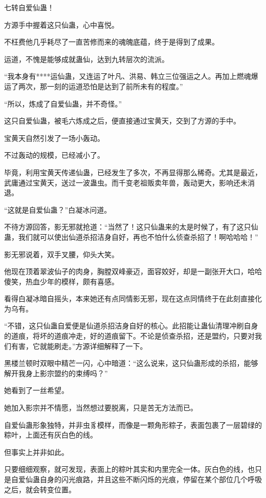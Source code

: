 
\begin{this_body}

七转自爱仙蛊！

方源手中握着这只仙蛊，心中喜悦。

不枉费他几乎耗尽了一直苦修而来的魂魄底蕴，终于是得到了成果。

运道，不愧是能够成就蛊仙，达到九转层次的流派。

“我本身有****运仙蛊，又连运了叶凡、洪易、韩立三位强运之人。再加上燃魂爆运了两次，那一刻的运道恐怕是达到了前所未有的程度。”

“所以，炼成了自爱仙蛊，并不奇怪。”

这只自爱仙蛊，被毛六炼成之后，便直接通过宝黄天，交到了方源的手中。

宝黄天自然引发了一场小轰动。

不过轰动的规模，已经减小了。

毕竟，利用宝黄天传递仙蛊，已经发生了多次，不再显得那么稀奇。尤其是最近，武庸通过宝黄天，送过一波蛊虫。而千变老祖贩卖年兽，轰动更大，影响还未消退。

“这就是自爱仙蛊？”白凝冰问道。

不待方源回答，影无邪就抢道：“当然了！这只仙蛊来的太是时候了，有了这只仙蛊，我们就可以使出仙道杀招洁身自好，再也不怕什么侦查杀招了！啊哈哈哈！”

影无邪说着，双手叉腰，仰头大笑。

他现在顶着翠波仙子的肉身，胸膛双峰豪迈，面容姣好，却是一副张开大口，哈哈傻笑，热血少年的模样，颇有喜感。

看得白凝冰暗自摇头，本来她还有点同情影无邪，现在这点同情终于在此刻直接化为乌有。

“不错，这只仙蛊自爱便是仙道杀招洁身自好的核心。此招能让蛊仙清理冲刷自身的道痕，将坏的道痕冲走，好的道痕留下。不论是侦查杀招，还是盟约，只要对我们有害，它就能刷走。”方源详细解释了一下。

黑楼兰顿时双眼中精芒一闪，心中暗道：“这么说来，这只仙蛊形成的杀招，能够解开我身上影宗盟约的束缚吗？”

她看到了一丝希望。

她加入影宗并不情愿，当然想过要脱离，只是苦无方法而已。

自爱仙蛊形象独特，并非虫豸模样，而像是一颗角形粽子，表面包裹了一层碧绿的粽叶，上面还有灰白色的线。

但事实上并非如此。

只要细细观察，就可发现，表面上的粽叶其实和内里完全一体。灰白色的线，也只是自爱仙蛊自身的闪光痕路，并且这些不断闪烁的光痕，停留在某个部位几个呼吸之后，就会转变位置。


\end{this_body}
